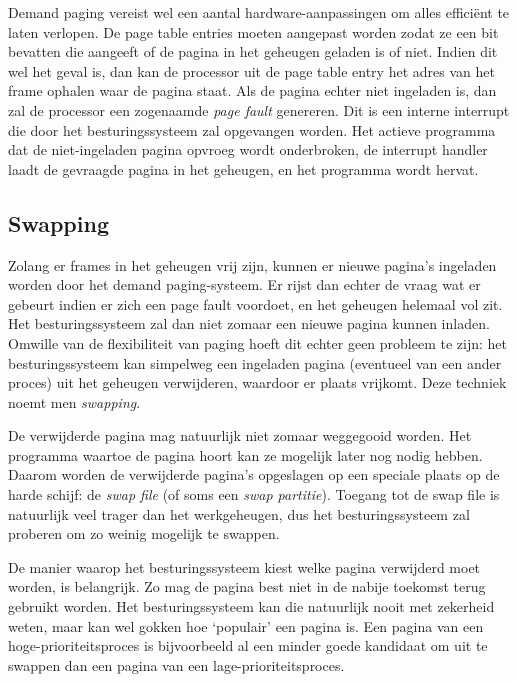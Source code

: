 Demand paging vereist wel een aantal hardware-aanpassingen om alles effici\"ent te laten verlopen. De page table entries moeten aangepast worden zodat ze een bit bevatten die aangeeft of de pagina in het geheugen geladen is of niet. Indien dit wel het geval is, dan kan de processor uit de page table entry het adres van het frame ophalen waar de pagina staat. Als de pagina echter niet ingeladen is, dan zal de processor een zogenaamde \emph{page fault} genereren. Dit is een interne interrupt die door het besturingssysteem zal opgevangen worden. Het actieve programma dat de niet-ingeladen pagina opvroeg wordt onderbroken, de interrupt handler laadt de gevraagde pagina in het geheugen, en het programma wordt hervat.


\subsection{Swapping}

Zolang er frames in het geheugen vrij zijn, kunnen er nieuwe pagina's ingeladen worden door het demand paging-systeem. Er rijst dan echter de vraag wat er gebeurt indien er zich een page fault voordoet, en het geheugen helemaal vol zit. Het besturingssysteem zal dan niet zomaar een nieuwe pagina kunnen inladen. Omwille van de flexibiliteit van paging hoeft dit echter geen probleem te zijn: het besturingssysteem kan simpelweg een ingeladen pagina (eventueel van een ander proces) uit het geheugen verwijderen, waardoor er plaats vrijkomt. Deze techniek noemt men \emph{swapping}.

De verwijderde pagina mag natuurlijk niet zomaar weggegooid worden. Het programma waartoe de pagina hoort kan ze mogelijk later nog nodig hebben. Daarom worden de verwijderde pagina's opgeslagen op een speciale plaats op de harde schijf: de \emph{swap file} (of soms een \emph{swap partitie}). Toegang tot de swap file is natuurlijk veel trager dan het werkgeheugen, dus het besturingssysteem zal proberen om zo weinig mogelijk te swappen.

De manier waarop het besturingssysteem kiest welke pagina verwijderd moet worden, is belangrijk. Zo mag de pagina best niet in de nabije toekomst terug gebruikt worden. Het besturingssysteem kan die natuurlijk nooit met zekerheid weten, maar kan wel gokken hoe `populair' een pagina is. Een pagina van een hoge-prioriteitsproces is bijvoorbeeld al een minder goede kandidaat om uit te swappen dan een pagina van een lage-prioriteitsproces.

